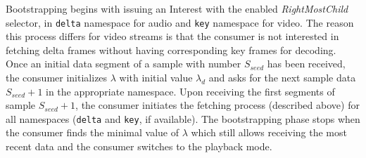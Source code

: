 \documentclass{icn/sig-alternate-2013} %
\begin{document}
Bootstrapping begins with issuing an Interest with the enabled \textit{RightMostChild} selector, in \texttt{delta} namespace for audio and \texttt{key} namespace for video. The reason this process differs for video streams is that the consumer is not interested in fetching delta frames without having corresponding key frames for decoding. Once an initial data segment of a sample with number $S_{seed}$ has been received, the consumer initializes $\lambda$ with initial value $\lambda_d$ and asks for the next sample data $S_{seed}+1$ in the appropriate namespace. Upon receiving the first segments of sample $S_{seed}+1$, the consumer initiates the fetching process (described above) for all namespaces (\texttt{delta} and \texttt{key}, if available). The bootstrapping phase stops when the consumer finds the minimal value of $\lambda$ which still allows receiving the most recent data and the consumer switches to the playback mode.












\end{document}
